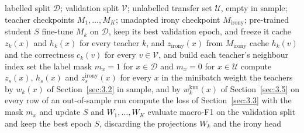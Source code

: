 \begin{algorithm}[htbp]
\caption{Distillation in and out of sample.}
\label{alg:training}
\begin{algorithmic}[1]
\Require labelled split $\mathcal{D}$; validation split $\mathcal{V}$; unlabelled transfer set
  $\mathcal{U}$, empty in sample; teacher checkpoints $M_1, \dots, M_K$; unadapted irony checkpoint
  $M_{\mathrm{irony}}$; pre-trained student $S$
  \State fine-tune $M_k$ on $\mathcal{D}$, keep its best validation epoch, and freeze it 
\EndFor
{}
  \State cache $z_k(x)$ and $h_k(x)$ for every teacher $k$, and $z_{\mathrm{irony}}(x)$ from $M_{\mathrm{irony}}$
\EndFor
{}
  \State cache $h_k(v)$ and the correctness $c_k(v)$ for every $v \in \mathcal{V}$, and build each
    teacher's neighbour index 
\EndIf
\State set the label mask $m_x = 1$ for $x \in \mathcal{D}$ and $m_x = 0$ for $x \in \mathcal{U}$
    \State compute $z_s(x)$, $h_s(x)$ and $z^{\mathrm{irony}}_s(x)$ for every $x$ in the minibatch
    \State weight the teachers by $w_k(x)$ of Section~\ref{sec:3.2} in sample, and by
      $w_k^{\mathrm{knn}}(x)$ of Section~\ref{sec:3.5} on every row of an out-of-sample run
    \State compute the loss of Section~\ref{sec:3.3} with the mask $m_x$ and update $S$ and $W_1, \dots, W_K$
  \EndFor
  \State evaluate macro-F1 on the validation split and keep the best epoch
\EndFor
\State \Return $S$, discarding the projections $W_k$ and the irony head
\end{algorithmic}
\end{algorithm}


